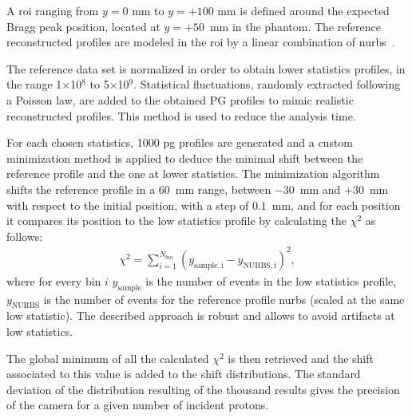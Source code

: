 A \gls{roi} ranging from $y=0$ mm to $y=+100$ mm is defined around the expected Bragg peak position, located at $y=+50$~mm in the phantom. The reference reconstructed profiles are modeled in the \gls{roi} by a linear combination of \gls{nurbs}~\parencite{Rogers2001}. 

The reference data set is normalized in order to obtain lower statistics profiles, in the range 1$\times$10$^8$ to 5$\times$10$^9$. Statistical fluctuations, randomly extracted following a Poisson law, are added to the obtained PG profiles to mimic realistic reconstructed profiles. This method is used to reduce the analysis time.

For each chosen statistics, 1000 \gls{pg} profiles are generated and a custom minimization method is applied to deduce the minimal shift between the reference profile and the one at lower statistics. The minimization algorithm shifts the reference profile in a 60~mm range, between $-30$~mm and $+30$~mm with respect to the initial position, with a step of $0.1$~mm, and for each position it compares its position to the low statistics profile by calculating the $\chi^2$ as follows:
\begin{eqnarray}
\chi^2 = \sum\limits_{i=1}^{N_{bin}} {(y_{\mathrm{sample,i}}-y_{\mathrm{NURBS,i}})^2},
\end{eqnarray}
where for every bin $i$ $y_{\mathrm{sample}}$ is the number of events in the low statistics profile, $y_{\mathrm{NURBS}}$ is the number of events for the reference profile \gls{nurbs} (scaled at the same low statistic). 
The described approach is robust and allows to avoid artifacts at low statistics.

The global minimum of all the calculated $\chi^2$ is then retrieved and the shift associated to this value is added to the shift distributions. %
The standard deviation of the distribution resulting of the thousand results gives the precision of the camera for a given number of incident protons. 

